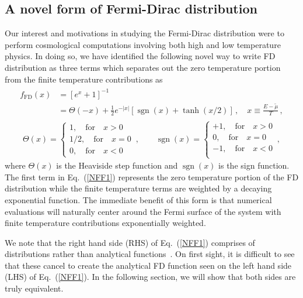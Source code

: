 \documentclass[sn-mathphys,Numbered]{sn-jnl}
\newcommand{\req}[1]{Eq.~(\ref{#1})}
\DeclareMathOperator{\sgn}{sgn}
\begin{document}
\subsection{A novel form of Fermi-Dirac distribution}
Our interest and motivations in studying the Fermi-Dirac distribution were to perform cosmological computations involving both high and low temperature physics. In doing so, we have identified the following novel way to write FD distribution as three terms which separates out the zero temperature portion from the finite temperature contributions as 
\begin{align}
\label{NFF1}
\begin{split}
f_\mathrm{FD}(x)
&=\left[e^{x}+1\right]^{-1}\\
&=\Theta(-x)+\frac{1}{2}e^{-|x|}\left[\sgn(x)+\tanh(x/2)\right]\,,\quad
x\equiv\frac{E-\widetilde\mu}{T}\,,
\end{split}
\end{align}
\begin{align}
\label{NFF2}
\Theta(x)=\left\{
\begin{array}{r}
1,\quad\mathrm{for}\quad{x}>0\\
1/2,\quad\mathrm{for}\quad{x}=0\\
0,\quad\mathrm{for}\quad{x}<0
\end{array}\right.\,,\qquad
\sgn(x)=\left\{
\begin{array}{r}
+1,\quad\mathrm{for}\quad{x}>0\\
0,\quad\mathrm{for}\quad{x}=0\\
-1,\quad\mathrm{for}\quad{x}<0\\
\end{array}\right.\,,
\end{align}
where $\Theta(x)$ is the Heaviside step function and $\sgn(x)$ is the sign function. The first term in \req{NFF1} represents the zero temperature portion of the FD distribution while the finite temperature terms are weighted by a decaying exponential function. The immediate benefit of this form is that numerical evaluations will naturally center around the Fermi surface of the system with finite temperature contributions exponentially weighted.

We note that the right hand side (RHS) of \req{NFF1} comprises of distributions rather than analytical functions~\cite{arfken_2011}. On first sight, it is difficult to see that these cancel to create the analytical FD function seen on the left hand side (LHS) of \req{NFF1}. In the following section, we will show that both sides are truly equivalent.
\end{document}
